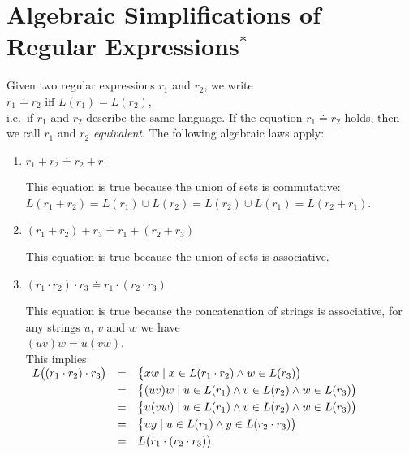 \section{Algebraic Simplifications of Regular Expressions$^*$}
Given two regular expressions $r_1$ and $r_2$, we write
\\[0.2cm]
\hspace*{1.3cm}
$r_1 \doteq r_2$ \quad iff \quad $L(r_1) = L(r_2)$,
\\[0.2cm]
i.e.~if $r_1$ and $r_2$ describe the same language.  If the equation $r_1 \doteq r_2$ holds, then we
call $r_1$ and $r_2$ \emph{equivalent}.  The following algebraic laws apply:
\begin{enumerate}
\item $r_1 + r_2 \doteq r_2 + r_1$

      This equation is true because the union of sets is commutative:
      \\[0.2cm]
      \hspace*{1.3cm}
      $L(r_1 + r_2) = L(r_1) \cup L(r_2) = L(r_2) \cup L(r_1) = L(r_2 + r_1)$.
\item $(r_1 + r_2) + r_3 \doteq r_1 + (r_2 + r_3)$

      This equation is true because the union of sets is associative.
\item $(r_1 \cdot r_2) \cdot r_3 \doteq r_1 \cdot (r_2 \cdot r_3)$

      This equation is true because the concatenation of strings is associative, for any strings
      $u$, $v$ and $w$ we have
      \\[0.2cm]
      \hspace*{1.3cm}
      $(u v) w = u (v w)$.
      \\[0.2cm]
      This implies
      \\[0.2cm]
      \hspace*{1.3cm}
      $
      \begin{array}[t]{lcl}
        L\bigl( (r_1 \cdot r_2) \cdot r_3\bigr) 
        & = & \bigl\{ x w \mid x \in L(r_1 \cdot r_2) \wedge w \in L(r_3)\bigr) \\[0.1cm]
        & = & \bigl\{ (u v) w \mid u \in L(r_1) \wedge v \in L(r_2) \wedge w \in L(r_3)\bigr) \\[0.1cm]
        & = & \bigl\{ u (v w) \mid u \in L(r_1) \wedge v \in L(r_2) \wedge w \in L(r_3)\bigr) \\[0.1cm]
        & = & \bigl\{ u y \mid u \in L(r_1) \wedge y \in L(r_2 \cdot r_3)\bigr) \\[0.1cm]
        & = & L\bigl( r_1 \cdot (r_2 \cdot r_3)\bigr).
      \end{array}
      $


\end{enumerate}
